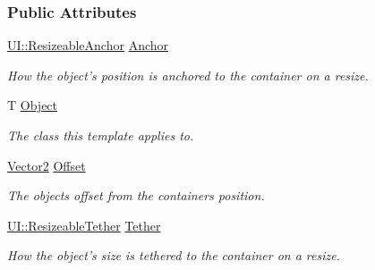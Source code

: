 \subsubsection*{Public Attributes}
\begin{DoxyCompactItemize}
\item 
\hypertarget{structMezzanine_1_1UI_1_1ResizingInfo_aca29457dafb1c57161fe67f7b9eb6d24}{
\hyperlink{namespaceMezzanine_1_1UI_a1c571649db3aa98f4e16285b5b754928}{UI::ResizeableAnchor} \hyperlink{structMezzanine_1_1UI_1_1ResizingInfo_aca29457dafb1c57161fe67f7b9eb6d24}{Anchor}}
\label{structMezzanine_1_1UI_1_1ResizingInfo_aca29457dafb1c57161fe67f7b9eb6d24}

\begin{DoxyCompactList}\small\item\em How the object's position is anchored to the container on a resize. \item\end{DoxyCompactList}\item 
\hypertarget{structMezzanine_1_1UI_1_1ResizingInfo_ac48bd9d36f5b20cc598eab26e7a09bb9}{
T \hyperlink{structMezzanine_1_1UI_1_1ResizingInfo_ac48bd9d36f5b20cc598eab26e7a09bb9}{Object}}
\label{structMezzanine_1_1UI_1_1ResizingInfo_ac48bd9d36f5b20cc598eab26e7a09bb9}

\begin{DoxyCompactList}\small\item\em The class this template applies to. \item\end{DoxyCompactList}\item 
\hypertarget{structMezzanine_1_1UI_1_1ResizingInfo_ac995688c2902d5888f9ec61695c32e1c}{
\hyperlink{classMezzanine_1_1Vector2}{Vector2} \hyperlink{structMezzanine_1_1UI_1_1ResizingInfo_ac995688c2902d5888f9ec61695c32e1c}{Offset}}
\label{structMezzanine_1_1UI_1_1ResizingInfo_ac995688c2902d5888f9ec61695c32e1c}

\begin{DoxyCompactList}\small\item\em The objects offset from the containers position. \item\end{DoxyCompactList}\item 
\hypertarget{structMezzanine_1_1UI_1_1ResizingInfo_ab9e6622146887d8a24f4a4a1935a91cb}{
\hyperlink{namespaceMezzanine_1_1UI_a0334e290e4c9f6a5468fbe11164a17b9}{UI::ResizeableTether} \hyperlink{structMezzanine_1_1UI_1_1ResizingInfo_ab9e6622146887d8a24f4a4a1935a91cb}{Tether}}
\label{structMezzanine_1_1UI_1_1ResizingInfo_ab9e6622146887d8a24f4a4a1935a91cb}

\begin{DoxyCompactList}\small\item\em How the object's size is tethered to the container on a resize. \item\end{DoxyCompactList}\end{DoxyCompactItemize}


